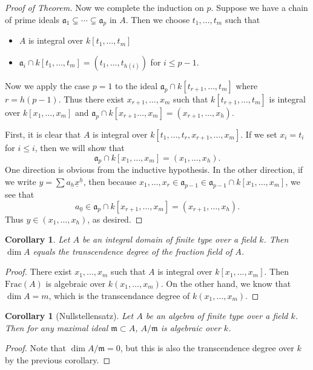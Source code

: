 \documentclass[leqno, openany]{memoir}
\newtheorem{cor}[thm]{Corollary}
\theoremstyle{definition}
\theoremstyle{remark}
\theoremstyle{plain}
\theoremstyle{definition}
\theoremstyle{remark}
\newcommand{\mf}[1]{\mathfrak{#1}}
\newcommand{\mr}[1]{\mathrm{#1}}
\newcommand{\ul}[1]{\underline{#1}}
\begin{document}
\begin{proof}[Proof of Theorem]
    Now we complete the induction on $p$. Suppose we have a chain of prime ideals $\mf{a}_1 \subsetneq \cdots \subsetneq \mf{a}_p$ in $A$. Then we choose $t_1, \ldots, t_m$ such that
    \begin{itemize}
        \item $A$ is integral over $k[t_1, \ldots, t_m]$
        \item $\mf{a}_i \cap k[t_1, \ldots, t_m] = (t_1, \ldots, t_{h(i)})$ for $i \leq p-1$.
    \end{itemize}
    Now we apply the case $p = 1$ to the ideal $\mf{a}_p \cap k[t_{r+1}, \ldots, t_m]$ where $r = h(p-1)$. Thus there exist $x_{r+1}, \ldots, x_m$ such that $k[t_{r+1}, \ldots, t_m]$ is integral over $k[x_1, \ldots, x_m]$ and $\mf{a}_p \cap k[x_{r+1} \ldots, x_m] = (x_{r+1}, \ldots, x_h)$.

    First, it is clear that $A$ is integral over $k[t_1, \ldots, t_r, x_{r+1}, \ldots, x_m]$. If we set $x_i = t_i$ for $i \leq i$, then we will show that
    \[ \mf{a}_p \cap k[x_1, \ldots, x_m] = (x_1, \ldots, x_h). \]
    One direction is obvious from the inductive hypothesis. In the other direction, if we write $y = \sum a_{\ul{h}} \ul{x}^{\ul{h}}$, then because $x_1, \ldots, x_r \in \mf{a}_{p-1} \in \mf{a}_{p-1} \cap k[x_1, \ldots, x_m]$, we see that 
    \[ a_{\ul{0}} \in \mf{a}_p \cap k[x_{r+1}, \ldots, x_m] = (x_{r+1}, \ldots, x_h). \]
    Thus $y \in (x_1, \ldots, x_h)$, as desired.
\end{proof}

\begin{cor}
    Let $A$ be an integral domain of finite type over a field $k$. Then $\dim A$ equals the transcendence degree of the fraction field of $A$.
\end{cor}

\begin{proof}
    There exist $x_1, \ldots, x_m$ such that $A$ is integral over $k[x_1, \ldots, x_m]$. Then $\mr{Frac}(A)$ is algebraic over $k(x_1, \ldots, x_m)$. On the other hand, we know that $\dim A = m$, which is the transcendance degree of $k(x_1, \ldots, x_m)$.
\end{proof}

\begin{cor}[Nullstellensatz]
    Let $A$ be an algebra of finite type over a field $k$. Then for any maximal ideal $\mf{m} \subset A$, $A / \mf{m}$ is algebraic over $k$.
\end{cor}

\begin{proof}
    Note that $\dim A/\mf{m} = 0$, but this is also the transcendence degree over $k$ by the previous corollary.
\end{proof}
\end{document}
